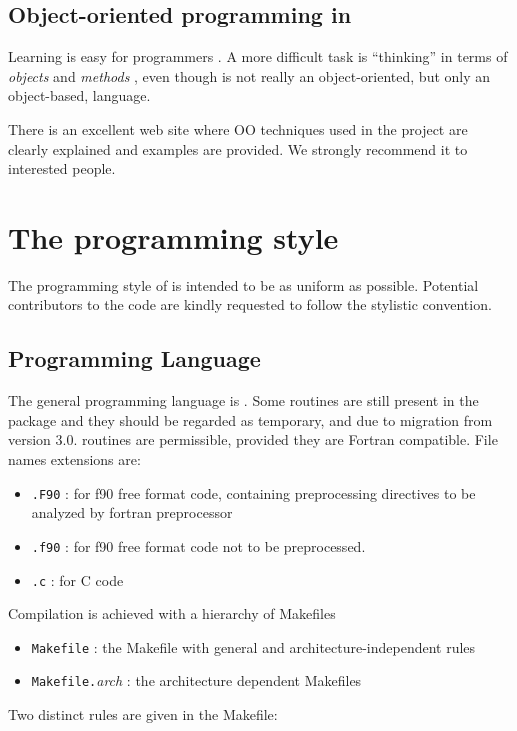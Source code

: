 \section{Object-oriented programming in \fort}


Learning \fort is easy for \oldfort  programmers
\cite{Brainerd,Metcalf,Kerrigan}. A more difficult task is ``thinking'' in
terms of {\em objects} and {\em methods} \cite{Stroustrup}, even though
\fort is not really an object-oriented, but only an object-based, language.\par
There is an excellent web site \cite{oof90_web} where OO techniques used in the \PR project are
clearly explained and examples are provided. We strongly recommend it to
interested  people.


\chapter{The \PR programming style}

The programming style of \PR is intended to be as uniform as possible.
Potential contributors to the code are kindly requested to follow the stylistic convention.

\section{Programming Language}

The general programming language is \fort. 
Some \oldfort routines are still present in the
package and they should be regarded as temporary, and due to migration
from version 3.0.
\C routines are permissible, provided they are Fortran compatible.
File names extensions are:

 \begin{itemize}
 \item 
 \verb=.F90= : for f90 free format code, containing preprocessing directives
  to be analyzed by fortran preprocessor
 \item
 \verb=.f90= : for f90 free format code not to be preprocessed.
 \item
 \verb=.c= : for C code 
 \end{itemize}

Compilation is achieved with a hierarchy of Makefiles
 \begin{itemize}
  \item
    \verb=Makefile= : the Makefile with general and architecture-independent 
                      rules
  \item
    \verb=Makefile.={\it arch} : the architecture dependent Makefiles
  \end{itemize}
Two distinct rules are given in the Makefile:

